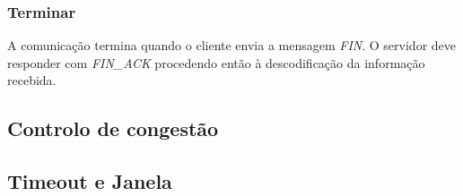 \documentclass{llncs}
\begin{document}
\subsubsection{Terminar}
A comunicação termina quando o cliente envia a mensagem \textit{FIN}. O servidor deve responder com \textit{FIN\_ACK} procedendo então à descodificação da informação recebida.

\subsection{Controlo de congestão}

\subsection{Timeout e Janela}

\end{document}
